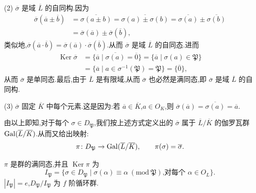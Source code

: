 (2) $\overline{\sigma}$ 是域 $\overline{L}$ 的自同构.因为
\begin{align*}
  \overline{\sigma}(\overline{a}\pm\overline{b})&=\overline{\sigma(a\pm b)}
  =\overline{\sigma(a)\pm\sigma(b)}=\overline{\sigma(a)}\pm\overline{\sigma(b)}\\
  &=\overline{\sigma}(\overline{a})\pm\overline{\sigma}(\overline{b}),
\end{align*}
类似地,$\overline{\sigma}(\overline{a}\cdot\overline{b})=\overline{\sigma}(\overline{a})\cdot\overline{\sigma}(\overline{b})$.从而 $\overline{\sigma}$ 是域 $\overline{L}$ 的自同态.进而
\begin{align*}
  \operatorname{Ker}\overline{\sigma}&=\{\overline{a}\mid\overline{\sigma(a)}=\overline{0}\}
  =\{\overline{a}\mid\sigma(a)\in\mathfrak{P}\}\\
  &=\{\overline{a}\mid a\in\sigma^{-1}(\mathfrak{P})=\mathfrak{P}\}=\{\overline{0}\},
\end{align*}
从而 $\overline{\sigma}$ 是单同态.最后,由于 $\overline{L}$ 是有限域,从而 $\overline{\sigma}$ 也必然是满同态,即 $\overline{\sigma}$ 是域 $\overline{L}$ 的自同构.

(3) $\overline{\sigma}$ 固定 $\overline{K}$ 中每个元素.这是因为:若 $\overline{a}\in\overline{K}$,$a\in O_K$,则 $\overline{\sigma}(\overline{a})=\overline{\sigma(a)}=\overline{a}$.

由以上即知,对于每个 $\sigma\in D_{\mathfrak{P}}$,我们按上述方式定义出的 $\overline{\sigma}$ 属于 $\overline{L}/\overline{K}$ 的伽罗瓦群 $\operatorname{Gal}(\overline{L}/\overline{K})$.从而又给出映射:
\[
  \pi\colon D_{\mathfrak{P}}\to\operatorname{Gal}(\overline{L}/\overline{K}),\qquad \pi(\sigma)=\overline{\sigma}.
\]

\begin{lemma}\label{lem:ch2-15}
$\pi$ 是群的满同态,并且 $\operatorname{Ker}\pi$ 为
\[
  I_{\mathfrak{P}}=\{\sigma\in D_{\mathfrak{P}}\mid\sigma(\alpha)\equiv\alpha\ (\mathrm{mod}\ \mathfrak{P})\text{,对每个 }\alpha\in O_L\}.
\]
$|I_{\mathfrak{P}}|=e$,$D_{\mathfrak{P}}/I_{\mathfrak{P}}$ 为 $f$ 阶循环群.
\end{lemma}

